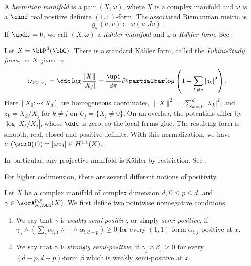 \begin{definition}[label=\labelNFM{def:kalher-and-hermitian-manifold}, status=draft, tag=0000000]
	A \emph{hermitian manifold} is a pair $(X,\omega)$,
	where $X$ is a complex manifold and $\omega$ is a $\cinf$ real positive definite $(1,1)$-form.
	The associated Riemannian metric is
	\[ g_\omega(u,v) \coloneqq \omega(u,Jv). \]
	If $\upd\omega = 0$, we call $(X,\omega)$ a \emph{K\"ahler manifold} and $\omega$ a \emph{K\"ahler form}.
	See \cite[Chapter~VI, Definition 4.1]{Demailly-2012-ComplexAnalyticDifferential}.
\end{definition}

\begin{example}[label=\labelNFM{eg:fubini-study-form-on-pn-as-kahler-manifold}, status=draft, tag=0000000]
	Let $X = \bbP^d(\bbC)$.
	There is a standard K\"ahler form, called the \emph{Fubini-Study form}, on $X$ given by
	\[ \omega_{\mathrm{FS}}|_{U_j} = \ddc\log\frac{\|X\|}{|X_j|} = \frac{\upi}{2\pi}\partial\partialbar\log\left(1 + \sum_{k \neq j}|z_k|^2\right). \]
	Here $[X_0:\cdots:X_d]$ are homogeneous coordinates, $\|X\|^2 = \sum_{k = 0}^d|X_k|^2$,
	and $z_k = X_k/X_j$ for $k \neq j$ on $U_j = \{X_j \neq 0\}$.
	On an overlap, the potentials differ by $\log|X_\ell/X_j|$,
	whose $\ddc$ is zero, so the local forms glue.
	The resulting form is smooth, real, closed and positive definite.
  With this normalization, we have $c_1(\scrO(1)) = [\omega_{\mathrm{FS}}] \in H^{1,1}(X)$.

	In particular, any projective manifold is K\"ahler by restriction.
See \cite[Chapter~VI, \S 4, Examples~4.4 and~4.6]{Demailly-2012-ComplexAnalyticDifferential}.
\end{example}

For higher codimension, there are several different notions of positivity.

\begin{definition}[label=\labelNFM{def:positivity-of-forms}, status=draft, tag=0000000]
	Let $X$ be a complex manifold of complex dimension $d$, $0 \leq p \leq d$,
	and $\gamma \in \scrA_{X,\bbR}^{p,p}(X)$.
	We first define two pointwise nonnegative conditions.
	\begin{enumerate}
		\item We say that $\gamma$ is \emph{weakly semi-positive}, or simply \emph{semi-positive}, if $\gamma_x \wedge \left(\sum_i \alpha_{i,1} \wedge \cdots \wedge \alpha_{i,d-p}\right) \geq 0$ for every $(1,1)$-form $\alpha_{i,j}$ positive at $x$.

		\item We say that $\gamma$ is \emph{strongly semi-positive}, if $\gamma_x \wedge \beta_x \geq 0$ for every $(d-p,d-p)$-form $\beta$ which is weakly semi-positive at $x$.
	\end{enumerate}
\end{definition}

